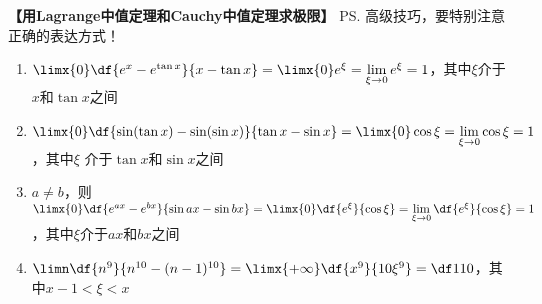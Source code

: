 \bigskip
{\bf 【用Lagrange中值定理和Cauchy中值定理求极限】}
\ps{高级技巧，要特别注意正确的表达方式！}

\begin{enumerate}[(1)]
  \setlength{\itemindent}{1cm}
  \item $\limx{0}\df{e^x-e^{\tan x}}{x-\tan x}=\limx{0}e^{\xi}
  =\lim\limits_{\xi\to 0}e^{\xi}=1$，其中$\xi$介于$x$和$\tan x$之间
  \item $\limx{0}\df{\sin(\tan x)-\sin(\sin x)}{\tan x-\sin x}
  =\limx{0}\cos\xi=\lim\limits_{\xi\to 0}\cos\xi=1$，其中$\xi$
  介于$\tan x$和$\sin x$之间
  \item $a\ne b$，则$\limx{0}\df{e^{ax}-e^{bx}}{\sin ax-\sin bx}
  =\limx{0}\df{e^{\xi}}{\cos\xi}=\lim\limits_{\xi\to 0}\df{e^{\xi}}{\cos\xi}
  =1$，其中$\xi$介于$ax$和$bx$之间
  \item $\limn\df{n^9}{n^{10}-(n-1)^{10}}=\limx{+\infty}
  \df{x^9}{10\xi^9}=\df1{10}$，其中$x-1<\xi<x$
\end{enumerate}